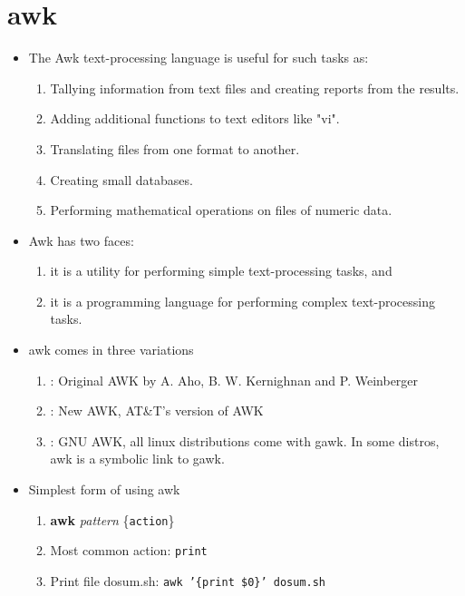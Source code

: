 \documentclass[10pt,t]{beamer}
\newcommand*\vardiamond{\textcolor{lubrown}{%
  \ensuremath{\blacklozenge}}}
\begin{document}
\section{awk}
\begin{frame}
  \begin{itemize}
    \item The Awk text-processing language is useful for such tasks as:
    \begin{enumerate}
      \item[$\bigstar$] Tallying information from text files and creating reports from the results.
      \item[$\bigstar$]Adding additional functions to text editors like "vi".
      \item[$\bigstar$] Translating files from one format to another.
      \item[$\bigstar$] Creating small databases.
      \item[$\bigstar$]Performing mathematical operations on files of numeric data.
    \end{enumerate}
    \item Awk has two faces: 
    \begin{enumerate}
      \item[$\bigstar$] it is a utility for performing simple text-processing tasks, and 
      \item[$\bigstar$] it is a programming language for performing complex text-processing tasks.
    \end{enumerate}
    \item awk comes in three variations
    \begin{enumerate}
        \item[awk]: Original AWK by A. Aho, B. W. Kernighnan and P. Weinberger
        \item[nawk]: New AWK, AT\&T's version of AWK
        \item[gawk]: GNU AWK, all linux distributions come with gawk. In some distros, awk is a symbolic link to gawk.
    \end{enumerate}
    \framebreak
    \item Simplest form of using awk
    \begin{enumerate}
      \item[$\vardiamond$]\textbf{awk} \textit{pattern} \{\texttt{action}\}
      \item[$\vardiamond$] Most common action: \texttt{print}
      \item[$\vardiamond$] Print file dosum.sh: \texttt{awk '\{print \$0\}' dosum.sh}

\end{enumerate}
\end{itemize}
\end{frame}
\end{document}
